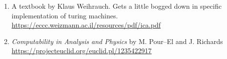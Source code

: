 \documentclass[a4paper,12pt]{article}
\begin{document}
	\begin{enumerate}
		\item A textbook by Klaus Weihrauch. Gets a little bogged down in specific implementation of turing machines. \url{https://eccc.weizmann.ac.il/resources/pdf/ica.pdf}
		\item \emph{Computability in Analysis and Physics} by M. Pour--El and J. Richards  \url{https://projecteuclid.org/euclid.pl/1235422917}
	\end{enumerate}
\end{document}
